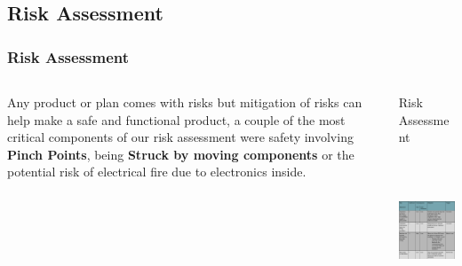 \documentclass[aspectratio=169]{beamer}
\begin{document}
\subsection{Risk Assessment}
\begin{frame}
    \frametitle{Risk Assessment}

    \begin{columns}
        \begin{column}{0.48\textwidth}
            Any product or plan comes with risks but mitigation of risks can help make a safe
            and functional product, a couple of the most critical components of our risk assessment
            were safety involving \textbf{Pinch Points}, being \textbf{Struck by moving components}
            or the potential risk of electrical fire due to electronics inside.
        \end{column}

        \begin{column}{0.48\textwidth}
            \begin{block}{Risk Assessment}
                \includegraphics[height=5cm]{RiskAssesment}
            \end{block}
        \end{column}
    \end{columns}


\end{frame}
\end{document}
